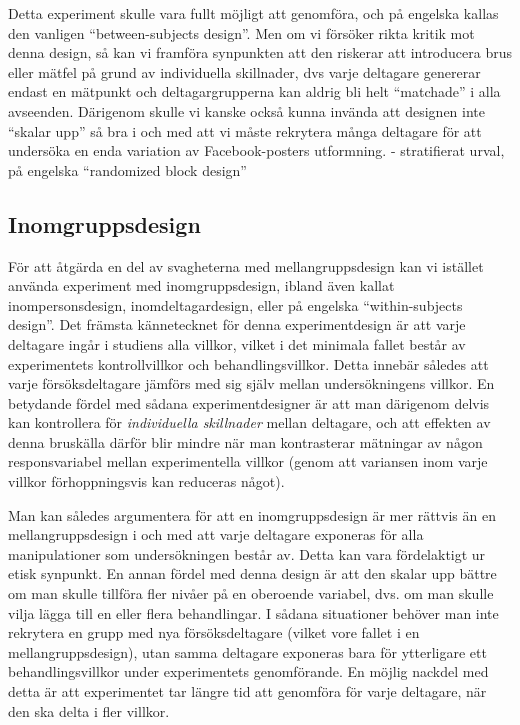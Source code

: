 \documentclass[
]{book}
\begin{document}
Detta experiment skulle vara fullt möjligt att genomföra, och på engelska kallas den vanligen ``between-subjects design''. Men om vi försöker rikta kritik mot denna design, så kan vi framföra synpunkten att den riskerar att introducera brus eller mätfel på grund av individuella skillnader, dvs varje deltagare genererar endast en mätpunkt och deltagargrupperna kan aldrig bli helt ``matchade'' i alla avseenden. Därigenom skulle vi kanske också kunna invända att designen inte ``skalar upp'' så bra i och med att vi måste rekrytera många deltagare för att undersöka en enda variation av Facebook-posters utformning. - stratifierat urval, på engelska ``randomized block design''

\hypertarget{sub07.5.4}{%
\subsection{Inomgruppsdesign}\label{sub07.5.4}}

För att åtgärda en del av svagheterna med mellangruppsdesign kan vi istället använda experiment med inomgruppsdesign, ibland även kallat inompersonsdesign, inomdeltagardesign, eller på engelska ``within-subjects design''. Det främsta kännetecknet för denna experimentdesign är att varje deltagare ingår i studiens alla villkor, vilket i det minimala fallet består av experimentets kontrollvillkor och behandlingsvillkor. Detta innebär således att varje försöksdeltagare jämförs med sig själv mellan undersökningens villkor. En betydande fördel med sådana experimentdesigner är att man därigenom delvis kan kontrollera för \emph{individuella skillnader} mellan deltagare, och att effekten av denna bruskälla därför blir mindre när man kontrasterar mätningar av någon responsvariabel mellan experimentella villkor (genom att variansen inom varje villkor förhoppningsvis kan reduceras något).

Man kan således argumentera för att en inomgruppsdesign är mer rättvis än en mellangruppsdesign i och med att varje deltagare exponeras för alla manipulationer som undersökningen består av. Detta kan vara fördelaktigt ur etisk synpunkt. En annan fördel med denna design är att den skalar upp bättre om man skulle tillföra fler nivåer på en oberoende variabel, dvs. om man skulle vilja lägga till en eller flera behandlingar. I sådana situationer behöver man inte rekrytera en grupp med nya försöksdeltagare (vilket vore fallet i en mellangruppsdesign), utan samma deltagare exponeras bara för ytterligare ett behandlingsvillkor under experimentets genomförande. En möjlig nackdel med detta är att experimentet tar längre tid att genomföra för varje deltagare, när den ska delta i fler villkor.
\end{document}

